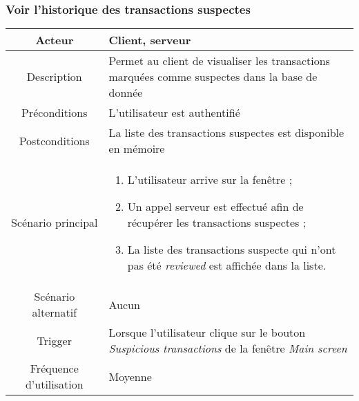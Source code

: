 \documentclass{article}
\begin{document}
\newpage


\subsubsection{Voir l'historique des transactions suspectes}
\begin{table}[h!]

\begin{tabular}{|c|p{11cm}|}
\hline
Acteur & Client, serveur \\
\hline
Description & Permet au client de visualiser les transactions marquées comme suspectes dans la base de donnée \\
\hline
Préconditions & L'utilisateur est authentifié \\
\hline
Postconditions & La liste des transactions suspectes est disponible en mémoire \\
\hline
Scénario principal & \begin{enumerate}
\item L'utilisateur arrive sur la fenêtre ;
\item Un appel serveur est effectué afin de récupérer les transactions suspectes ;
\item La liste des transactions suspecte qui n'ont pas été \emph{reviewed} est affichée dans la liste.
\end{enumerate} \\
\hline
Scénario alternatif & Aucun \\
\hline
Trigger & Lorsque l'utilisateur clique sur le bouton \emph{Suspicious transactions} de la fenêtre \emph{Main screen} \\
\hline
Fréquence d'utilisation & Moyenne \\
\hline
\end{tabular}

\end{table}


\newpage
\end{document}
